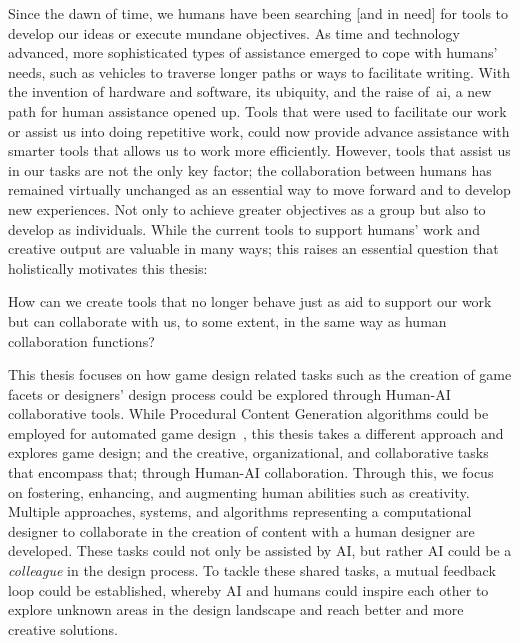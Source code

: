 Since the dawn of time, we humans have been searching [and in need] for tools to develop our ideas or execute mundane objectives. As time and technology advanced, more sophisticated types of assistance emerged to cope with humans' needs, such as vehicles to traverse longer paths or ways to facilitate writing. With the invention of hardware and software, its ubiquity, and the raise of~\acrfull{ai}, a new path for human assistance opened up. Tools that were used to facilitate our work or assist us into doing repetitive work, could now provide advance assistance with smarter tools that allows us to work more efficiently. However, tools that assist us in our tasks are not the only key factor; the collaboration between humans has remained virtually unchanged as an essential way to move forward and to develop new experiences. Not only to achieve greater objectives as a group but also to develop as individuals. While the current tools to support humans' work and creative output are valuable in many ways; this raises an essential question that holistically motivates this thesis:

\setlength{\parindent}{0.9em}

\begin{retQuestion}{}
 How can we create tools that no longer behave just as aid to support our work but can collaborate with us, to some extent, in the same way as human collaboration functions? 
\end{retQuestion}

This thesis focuses on how game design related tasks such as the creation of game facets or designers' design process could be explored through Human-AI collaborative tools. While Procedural Content Generation algorithms could be employed for automated game design~\cite{nelson_towards_2007,cook_software_2020,cook_getting_2020}, this thesis takes a different approach and explores game design; and the creative, organizational, and collaborative tasks that encompass that; through Human-AI collaboration. Through this, we focus on fostering, enhancing, and augmenting human abilities such as creativity. Multiple approaches, systems, and algorithms representing a computational designer to collaborate in the creation of content with a human designer are developed. These tasks could not only be assisted by AI, but rather AI could be a \emph{colleague} in the design process. To tackle these shared tasks, a mutual feedback loop could be established, whereby AI and humans could inspire each other to explore unknown areas in the design landscape and reach better and more creative solutions.

